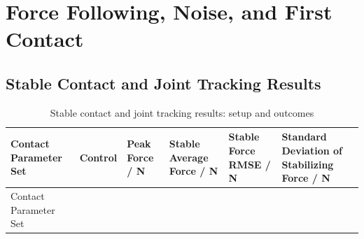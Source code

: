 
\FloatBarrier

\section{Force Following, Noise, and First Contact}

\label{stage:s10}

\subsection{Stable Contact and Joint Tracking Results}\label{s10-detail-1}

\FloatBarrier\begingroup\small\setlength{\tabcolsep}{2.5pt}
\begin{longtable}[]{@{}
  >{\raggedright\arraybackslash}p{}
  >{\raggedright\arraybackslash}p{}
  >{\raggedright\arraybackslash}p{}
  >{\raggedright\arraybackslash}p{}
  >{\raggedright\arraybackslash}p{}
  >{\raggedright\arraybackslash}p{}@{}}
\caption{Stable contact and joint tracking results: setup and outcomes}\label{tab:s10-1}\tabularnewline
\toprule\noalign{}
\begin{minipage}[b]{\linewidth}\raggedright
Contact Parameter Set
\end{minipage} & \begin{minipage}[b]{\linewidth}\raggedright
Control
\end{minipage} & \begin{minipage}[b]{\linewidth}\raggedright
Peak Force / N
\end{minipage} & \begin{minipage}[b]{\linewidth}\raggedright
Stable Average Force / N
\end{minipage} & \begin{minipage}[b]{\linewidth}\raggedright
Stable Force RMSE / N
\end{minipage} & \begin{minipage}[b]{\linewidth}\raggedright
Standard Deviation of Stabilizing Force / N
\end{minipage} \\
\midrule\noalign{}
\endfirsthead
\toprule\noalign{}
\begin{minipage}[b]{\linewidth}\raggedright
Contact Parameter Set

\end{minipage}
\end{longtable}

